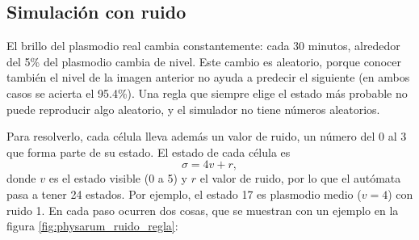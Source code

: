 \subsection{Simulación con ruido}

El brillo del plasmodio real cambia constantemente: cada 30 minutos, alrededor del 5\% del plasmodio cambia de nivel. Este cambio es aleatorio, porque conocer también el nivel de la imagen anterior no ayuda a predecir el siguiente (en ambos casos se acierta el 95.4\%). Una regla que siempre elige el estado más probable no puede reproducir algo aleatorio, y el simulador no tiene números aleatorios.

Para resolverlo, cada célula lleva además un valor de ruido, un número del 0 al 3 que forma parte de su estado. El estado de cada célula es
\[
	\sigma = 4v + r,
\]
donde $v$ es el estado visible (0 a 5) y $r$ el valor de ruido, por lo que el autómata pasa a tener 24 estados. Por ejemplo, el estado 17 es plasmodio medio ($v = 4$) con ruido 1. En cada paso ocurren dos cosas, que se muestran con un ejemplo en la figura \ref{fig:physarum_ruido_regla}:

